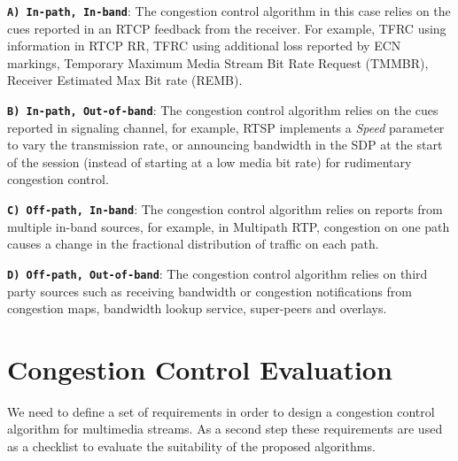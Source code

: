 \textbf{\texttt{A) In-path, In-band}}: The congestion control algorithm in
this case relies on the cues reported in an RTCP feedback from the receiver.
For example, TFRC using information in RTCP RR, TFRC using additional loss
reported by ECN markings, Temporary Maximum Media Stream Bit Rate Request
(TMMBR), Receiver Estimated Max Bit rate (REMB).

\textbf{\texttt{B) In-path, Out-of-band}}: The congestion control algorithm
relies on the cues reported in signaling channel, for example, RTSP implements
a \emph{Speed} parameter to vary the transmission rate, or announcing
bandwidth in the SDP at the start of the session (instead of starting at a low
media bit rate) for rudimentary congestion control.

\textbf{\texttt{C) Off-path, In-band}}: The congestion control algorithm
relies on reports from multiple in-band sources, for example, in Multipath
RTP, congestion on one path causes a change in the fractional distribution of
traffic on each path.

\textbf{\texttt{D) Off-path, Out-of-band}}: The congestion control
algorithm relies on third party sources such as receiving bandwidth or
congestion notifications from congestion maps, bandwidth lookup service,
super-peers and overlays.




\section{Congestion Control Evaluation}
\label{fw.cc.eval}

We need to define a set of requirements in order to design a congestion
control algorithm for multimedia streams. As a second step these requirements
are used as a checklist to evaluate the suitability of the proposed
algorithms.

